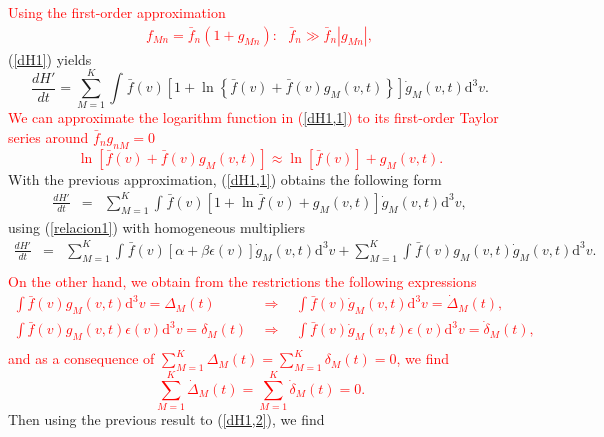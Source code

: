 \documentclass{article}
\begin{document}
\textcolor{red}{Using the first-order approximation
\begin{eqnarray}
   f_{Mn}=\bar{f}_{n}(1+g_{Mn}): \ \ \ \bar{f}_{n}\gg \bar{f}_{n}|g_{Mn}|, \label{firstorder}
\end{eqnarray}}
(\ref{dH1}) yields
\begin{equation}
    \frac{dH'}{dt}=\sum_{M=1}^{K}\int_{}^{}\bar f(v) \left [ 1+\ln \left\{ \bar f(v)+\bar f(v)g_M(v,t) \right\} \right]\dot g_M(v,t)\mathrm{d}^3v  \label{dH1,1}.
\end{equation}
\textcolor{red}{We can approximate the logarithm function in (\ref{dH1,1}) to its first-order Taylor series around $\bar f_n g_{nM}=0$ 
\begin{equation}
    \ln [\bar{f}(v)+\bar{f}(v) g_{M}(v,t)] \approx \ln [\bar{f}(v)]+ g_{M}(v,t). \label{lnapproximationclassical}
\end{equation}}
With the previous approximation, (\ref{dH1,1}) obtains the following form 
\begin{eqnarray}
    \frac{dH'}{dt}&=&\sum_{M=1}^{K} \int_{}^{} \bar f(v)\left[ 1+\ln \bar f(v)+g_M(v,t) \right]\dot g_M(v,t)\mathrm{d}^3v,
\end{eqnarray}{}
using (\ref{relacion1}) with homogeneous multipliers
\begin{eqnarray}
    \frac{dH'}{dt}&=&\sum_{M=1}^{K}\int_{}^{}\bar f(v)\left[ \alpha+\beta \epsilon(v) \right]\dot g_M(v,t)\mathrm{d}^3v +\sum_{M=1}^{K}\int_{}^{}\bar f(v)g_M(v,t)\dot g_M(v,t)\mathrm{d}^3v \label{dH1,2}. \nonumber \\
\end{eqnarray}{}
\textcolor{red}{On the other hand, we obtain from the restrictions the following expressions
\begin{eqnarray}
    \int \bar{f}(v) g_{M}(v,t) \mathrm{d}^{3}v=\Delta_M(t) \ \  &\Rightarrow& \ \  \int \bar{f}(v) \dot{g}_{M}(v,t)\mathrm{d}^{3}v=\dot{\Delta}_M(t), \nonumber \\
    \int  \bar{f}(v) g_{M}(v,t)\epsilon(v) \mathrm{d}^{3}v=\delta_M(t) \ \  &\Rightarrow& \ \  \int \bar{f}(v) \dot{g}_{M}(v,t)\epsilon(v) \mathrm{d}^{3}v=\dot{\delta}_M(t), \nonumber \\
\end{eqnarray}{}
and as a consequence of $\sum_{M=1}^{K}
\Delta_M(t)  =\sum_{M=1}^{K} \delta_M(t) =0$, we find
\begin{equation}
    \sum_{M=1}^{K} \dot{\Delta}_M(t)  =\sum_{M=1}^{K} \dot{\delta}_{M}(t) =0.
\end{equation}}
Then using the previous result to (\ref{dH1,2}), we find
\end{document}
